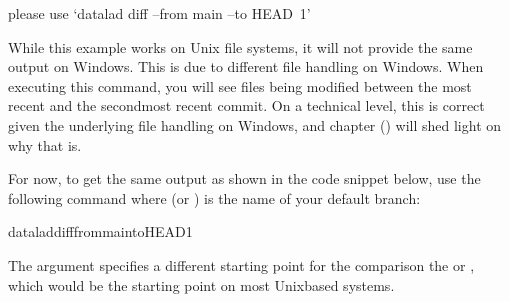 \ignorespaces \begin{windowswit}[label={ww-diff-adjusted}, before title={\thetcbcounter\ }, float, floatplacement=tb, check odd page=true]{please use ‘datalad diff –from main –to HEAD~1’}
\label{\detokenize{basics/101-109-rerun:ww-diff-adjusted}}

\sphinxAtStartPar
While this example works on Unix file systems, it will not provide the same output on Windows.
This is due to different file handling on Windows.
When executing this command, you will see  files being modified between the most recent and the second\sphinxhyphen{}most recent commit.
On a technical level, this is correct given the underlying file handling on Windows, and chapter {\hyperref[\detokenize{basics/basics-annex:chapter-gitannex}]{}} () will shed light on why that is.

\sphinxAtStartPar
For now, to get the same output as shown in the code snippet below, use the following command where  (or ) is the name of your default branch:

\begin{sphinxVerbatim}[commandchars=\\\{\}]
dataladdiff\PYGZhy{}\PYGZhy{}frommain\PYGZhy{}\PYGZhy{}toHEAD\PYGZti{}1
\end{sphinxVerbatim}

\sphinxAtStartPar
The  argument specifies a different starting point for the comparison \sphinxhyphen{} the  or {\hyperref[\detokenize{glossary:term-master}]{}} {\hyperref[\detokenize{glossary:term-branch}]{}}, which would be the starting point on most Unix\sphinxhyphen{}based systems.


\end{windowswit}

